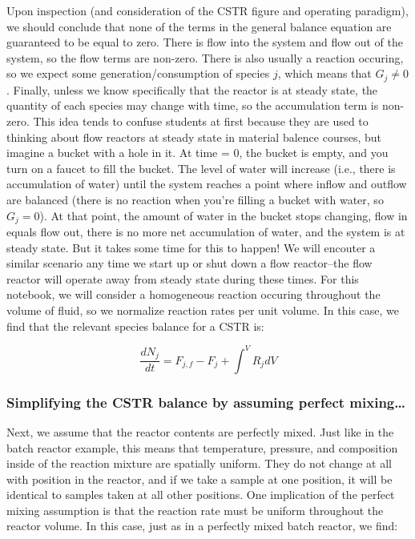 \documentclass[11pt]{article}
\begin{document}
Upon inspection (and consideration of the CSTR figure and operating
paradigm), we should conclude that none of the terms in the general
balance equation are guaranteed to be equal to zero. There is flow into
the system and flow out of the system, so the flow terms are non-zero.
There is also usually a reaction occuring, so we expect some
generation/consumption of species \(j\), which means that
\(G_j \neq 0\). Finally, unless we know specifically that the reactor is
at steady state, the quantity of each species may change with time, so
the accumulation term is non-zero. This idea tends to confuse students
at first because they are used to thinking about flow reactors at steady
state in material balence courses, but imagine a bucket with a hole in
it. At time = 0, the bucket is empty, and you turn on a faucet to fill
the bucket. The level of water will increase (i.e., there is
accumulation of water) until the system reaches a point where inflow and
outflow are balanced (there is no reaction when you're filling a bucket
with water, so \(G_j = 0\)). At that point, the amount of water in the
bucket stops changing, flow in equals flow out, there is no more net
accumulation of water, and the system is at steady state. But it takes
some time for this to happen! We will encouter a similar scenario any
time we start up or shut down a flow reactor--the flow reactor will
operate away from steady state during these times. For this notebook, we
will consider a homogeneous reaction occuring throughout the volume of
fluid, so we normalize reaction rates per unit volume. In this case, we
find that the relevant species balance for a CSTR is:

\[\frac{dN_j}{dt} = F_{j,f} - F_j + \int^V R_j dV\]

    \hypertarget{simplifying-the-cstr-balance-by-assuming-perfect-mixing}{%
\subsubsection{Simplifying the CSTR balance by assuming perfect
mixing\ldots{}}\label{simplifying-the-cstr-balance-by-assuming-perfect-mixing}}

Next, we assume that the reactor contents are perfectly mixed. Just like
in the batch reactor example, this means that temperature, pressure, and
composition inside of the reaction mixture are spatially uniform. They
do not change at all with position in the reactor, and if we take a
sample at one position, it will be identical to samples taken at all
other positions. One implication of the perfect mixing assumption is
that the reaction rate must be uniform throughout the reactor volume. In
this case, just as in a perfectly mixed batch reactor, we find:
\end{document}
